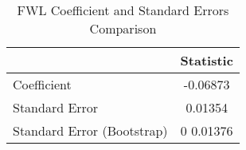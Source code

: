 
\begin{table}[ht]
\centering
\begin{tabular}{l c}
\hline
 & Statistic \\
\hline
Coefficient &  -0.06873  \\
Standard Error &  0.01354  \\
Standard Error (Bootstrap) &  0 0.01376  \\
\hline
\end{tabular}
\caption{FWL Coefficient and Standard Errors Comparison}
\label{tab:fwl_comparison}
\end{table}
